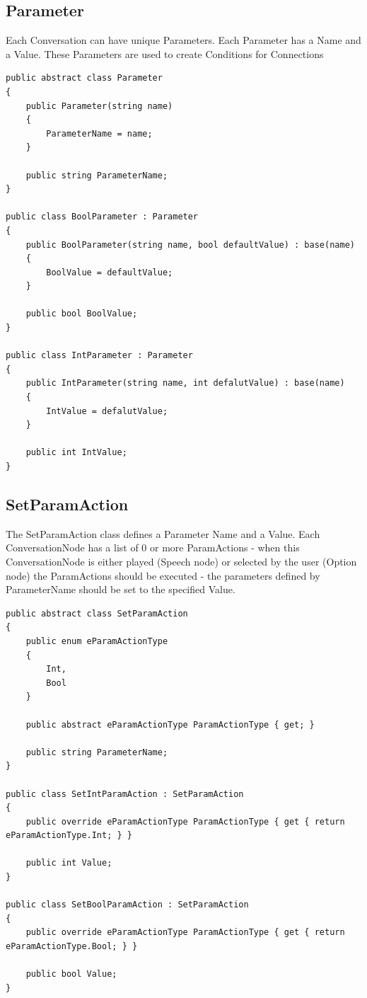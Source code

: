 \documentclass[a4paper,12pt]{article}
\begin{document}
\subsection{Parameter}
Each Conversation can have unique Parameters. Each Parameter has a Name and a Value. These Parameters are used to create Conditions for Connections
\begin{lstlisting}
public abstract class Parameter
{
	public Parameter(string name)
	{
		ParameterName = name;
	}

	public string ParameterName;
}

public class BoolParameter : Parameter
{
	public BoolParameter(string name, bool defaultValue) : base(name)
	{
		BoolValue = defaultValue;
	}

	public bool BoolValue;
}

public class IntParameter : Parameter
{
	public IntParameter(string name, int defalutValue) : base(name)
	{
		IntValue = defalutValue;
	}

	public int IntValue;
}
\end{lstlisting}
\newpage


\subsection{SetParamAction}
The SetParamAction class defines a Parameter Name and a Value. Each ConversationNode has a list of 0 or more ParamActions - when this ConversationNode is either played (Speech node) or selected by the user (Option node) the ParamActions should be executed - the parameters defined by ParameterName should be set to the specified Value.
\begin{lstlisting}
public abstract class SetParamAction
{
	public enum eParamActionType
	{
		Int,
		Bool
	}

	public abstract eParamActionType ParamActionType { get; }

	public string ParameterName;
}

public class SetIntParamAction : SetParamAction
{
	public override eParamActionType ParamActionType { get { return eParamActionType.Int; } }

	public int Value;
}

public class SetBoolParamAction : SetParamAction
{
	public override eParamActionType ParamActionType { get { return eParamActionType.Bool; } }

	public bool Value;
}
\end{lstlisting}



\newpage
\end{document}
